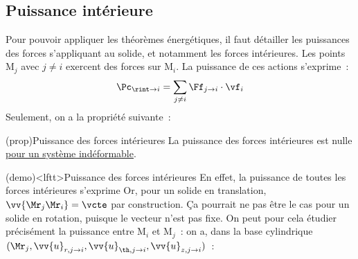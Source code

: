 \documentclass[../../main/main.tex]{subfiles}
\begin{document}
\subsection{Puissance intérieure}
Pour pouvoir appliquer les théorèmes énergétiques, il faut détailler les
puissances des forces s'appliquant au solide, et notamment les forces
intérieures. Les points M$_j$ avec $j\neq i$ exercent des forces sur M$_i$. La
puissance de ces actions s'exprime~:
\[\Pc_{\rint\to i} = \sum_{j\neq i} \Ff_{j\to i}\cdot\vf_i\]
Seulement, on a la propriété suivante~:
\begin{tcb*}(prop){Puissance des forces intérieures}
	La puissance des forces intérieures est nulle \ul{pour un système
		indéformable}.
\end{tcb*}
\begin{tcb*}(demo)<lftt>{Puissance des forces intérieures}
	En effet, la puissance de toutes les forces intérieures s'exprime
	\psw{
		\[
			\Pc_{\rint} =
			\sum_i\Pc_{\rint\to i} =
			\sum_i\sum_{j\neq i}\Ff_{j\to i}\cdot \vf_i =
			\sum_i\sum_{j\neq i}\Ff_{j\to i}\cdot \dv{\vv{\Mr_j\Mr_i}}{t}
		\]
	}%
	Or, pour un solide en translation, $\vv{\Mr_j\Mr_i} = \vcte$ par construction.
	Ça pourrait ne pas être le cas pour un solide en rotation, puisque le vecteur
	n'est pas fixe. On peut pour cela étudier précisément la puissance entre
	M$_i$ et M$_j$~: on a, dans la base cylindrique $(\Mr_j, \vv{u}_{r,j\to i},
		\vv{u}_{\th,j\to i}, \vv{u}_{z,j\to i})$~:
\end{tcb*}
\end{document}
